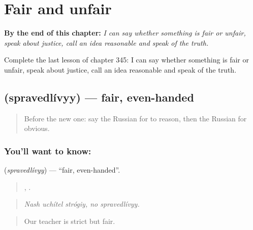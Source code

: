 
\chapter{Fair and unfair}
\label{ch:ru-fair-and-unfair}

\begin{chapteropening}
\textbf{By the end of this chapter:} \emph{I can say whether something is fair or unfair, speak about justice, call an idea reasonable and speak of the truth.}

Complete the last lesson of chapter 345: I can say whether something is fair or unfair, speak about justice, call an idea reasonable and speak of the truth.
\end{chapteropening}

\section[\texorpdfstring{\ru{справедливый} (spravedlívyy)}{справедливый (spravedlívyy)}]{ (spravedlívyy) — fair, even-handed}

\label{lesson:RU-C345-spravedlivyy}



\begin{quote}
Before the new one: say the Russian for to reason, then the Russian for obvious.
\end{quote}

\subsection*{You'll want to know: }
\textbf{} (\emph{spravedlívyy}) — \textquotedblleft{}fair, even-handed\textquotedblright{}.

\begin{quote}
  ,  .
\end{quote}

\begin{quote}
\emph{Nash uchítel strógiy, no spravedlívyy.}
\end{quote}

\begin{quote}
Our teacher is strict but fair.
\end{quote}

